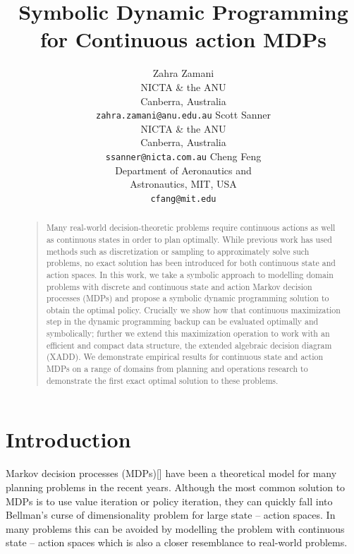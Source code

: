 \documentclass[letterpaper]{article}
\begin{document}
%
\title{Symbolic Dynamic Programming for Continuous action MDPs}
\author{Zahra Zamani\\
NICTA \& the ANU\\
Canberra, Australia\\
{\tt zahra.zamani@anu.edu.au}
\And
Scott Sanner\\
NICTA \& the ANU\\
Canberra, Australia\\
{\tt ssanner@nicta.com.au}
\And
Cheng Feng\\
Department of Aeronautics and\\
Astronautics, MIT, USA\\
{\tt cfang@mit.edu}
}
\maketitle
\begin{abstract}
\begin{quote}
Many real-world decision-theoretic problems require continuous actions as well as continuous 
states in order to plan optimally. While previous work has used methods such as discretization or 
sampling to approximately solve such problems, no exact solution has been introduced for both 
continuous state and action spaces. In this work, we take a symbolic approach to modelling domain 
problems with discrete and continuous state and action Markov decision processes (MDPs) and 
propose a symbolic dynamic programming solution to obtain the optimal policy. Crucially we show 
how that continuous maximization step in the dynamic programming backup can be evaluated 
optimally and symbolically; further we extend this maximization operation to work with an 
efficient and compact data structure, the extended algebraic decision diagram (XADD). We 
demonstrate empirical results for continuous state and action MDPs on a range of domains from 
planning and operations research to demonstrate the first exact optimal solution to these 
problems.
\end{quote}
\end{abstract}


\section{Introduction}


Markov decision processes (MDPs)[] have been a theoretical model for many planning problems in the recent years. Although the most common solution to MDPs is to use value iteration or policy iteration, they can quickly fall into Bellman's curse of dimensionality problem for large state – action spaces. In many problems this can be avoided by modelling the problem with continuous state – action spaces which is also a closer resemblance to real-world problems. 
\end{document}

